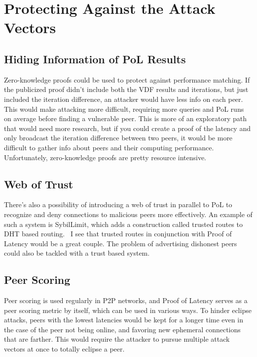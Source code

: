 \section{Protecting Against the Attack Vectors}
\subsection{Hiding Information of PoL Results}
Zero-knowledge proofs could be used to protect against performance matching. If the publicized proof didn't include both the VDF results and iterations, but just included the iteration difference, an attacker would have less info on each peer. This would make attacking more difficult, requiring more queries and PoL runs on average before finding a vulnerable peer. This is more of an exploratory path that would need more research, but if you could create a proof of the latency and only broadcast the iteration difference between two peers, it would be more difficult to gather info about peers and their computing performance. Unfortunately, zero-knowledge proofs are pretty resource intensive.

\subsection{Web of Trust}
There's also a possibility of introducing a web of trust in parallel to PoL to recognize and deny connections to malicious peers more effectively. An example of such a system is SybilLimit, which adds a construction called trusted routes to DHT based routing.~\cite{Yu2008-xl} I see that trusted routes in conjunction with Proof of Latency would be a great couple. The problem of advertising dishonest peers could also be tackled with a trust based system.

\subsection{Peer Scoring}
Peer scoring is used regularly in P2P networks, and Proof of Latency serves as a peer scoring metric by itself, which can be used in various ways. To hinder eclipse attacks, peers with the lowest latencies would be kept for a longer time even in the case of the peer not being online, and favoring new ephemeral connections that are farther. This would require the attacker to pursue multiple attack vectors at once to totally eclipse a peer.

